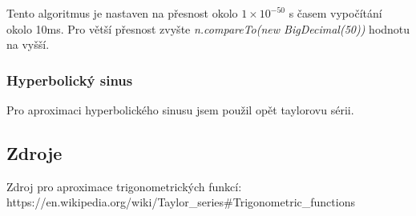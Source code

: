 \documentclass{article}
\begin{document}
    Tento algoritmus je nastaven na přesnost okolo $1\times{10^{-50}}$ s časem vypočítání okolo 10ms. Pro
    větší přesnost zvyšte \textit{n.compareTo(new BigDecimal(50))} hodnotu na vyšší.
    \subsubsection{Hyperbolický sinus}
    Pro aproximaci hyperbolického sinusu jsem použil opět taylorovu sérii.
        
    \subsection{Zdroje}
    \sloppy
    Zdroj pro aproximace trigonometrických funkcí: \newline
    \indent https://en.wikipedia.org/wiki/Taylor_series#Trigonometric_functions
    
\end{document}
